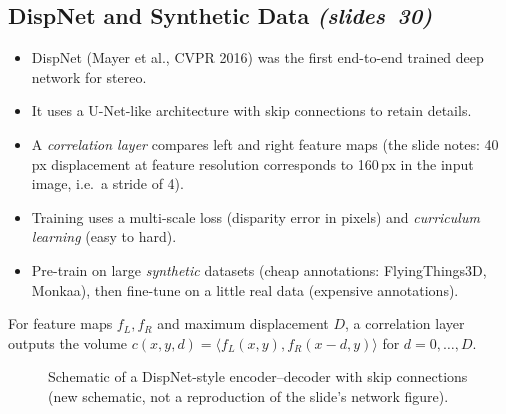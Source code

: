 \documentclass[11pt,a4paper]{article}
\newcommand{\slr}[1]{\texorpdfstring{\emph{(slides~#1)}}{(slides #1)}}
\theoremstyle{definition}
\begin{document}
\subsection{DispNet and Synthetic Data \slr{30}}
\begin{itemize}
\item DispNet (Mayer et al., CVPR 2016) was the first end-to-end trained deep network for stereo.
\item It uses a U-Net-like architecture with skip connections to retain details.
\item A \emph{correlation layer} compares left and right feature maps (the slide notes: 40\,px displacement at feature resolution corresponds to 160\,px in the input image, i.e.\ a stride of 4).
\item Training uses a multi-scale loss (disparity error in pixels) and \emph{curriculum learning} (easy to hard).
\item Pre-train on large \emph{synthetic} datasets (cheap annotations: FlyingThings3D, Monkaa), then fine-tune on a little real data (expensive annotations).
\end{itemize}
\begin{Definition}
For feature maps $f_L,f_R$ and maximum displacement $D$, a correlation layer outputs the volume $c(x,y,d)=\langle f_L(x,y),f_R(x-d,y)\rangle$ for $d=0,\dots,D$.
\end{Definition}
\begin{figure}[H]\centering
{}
\caption{Schematic of a DispNet-style encoder--decoder with skip connections (new schematic, not a reproduction of the slide's network figure).}
\end{figure}
\end{document}
